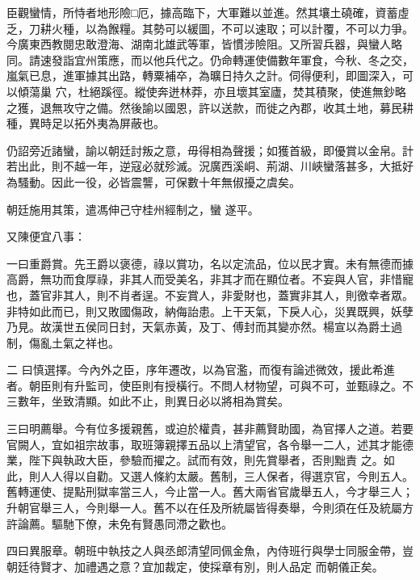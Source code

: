 \begin{pinyinscope}
 臣觀蠻情，所恃者地形險□厄，據高臨下，大軍難以並進。然其壤土磽確，資蓄虛乏，刀耕火種，以為餱糧。其勢可以緩圖，不可以速取；可以計覆，不可以力爭。今廣東西教閱忠敢澄海、湖南北雄武等軍，皆慣涉險阻。又所習兵器，與蠻人略同。請速發詣宜州策應，而以他兵代之。仍命轉運使備數年軍食，今秋、冬之交，嵐氣已息，進軍據其出路，轉粟補卒，為曠日持久之計。伺得便利，即圖深入，可以傾蕩巢
 穴，杜絕蹊徑。縱使奔迸林莽，亦且壞其室廬，焚其積聚，使進無鈔略之獲，退無攻守之備。然後諭以國恩，許以送款，而徙之內郡，收其土地，募民耕種，異時足以拓外夷為屏蔽也。



 仍詔旁近諸蠻，諭以朝廷討叛之意，毋得相為聲援；如獲首級，即優賞以金帛。計若出此，則不越一年，逆寇必就殄滅。況廣西溪峒、荊湖、川峽蠻落甚多，大抵好為騷動。因此一役，必皆震讋，可保數十年無俶擾之虞矣。



 朝廷施用其策，遣馮伸己守桂州經制之，蠻
 遂平。



 又陳便宜八事：



 一曰重爵賞。先王爵以褒德，祿以賞功，名以定流品，位以民才實。未有無德而據高爵，無功而食厚祿，非其人而受美名，非其才而在顯位者。不妄與人官，非惜寵也，蓋官非其人，則不肖者逞。不妄賞人，非愛財也，蓋實非其人，則徼幸者眾。非特如此而已，則又敗國傷政，納侮詒患。上干天氣，下戾人心，災異既興，妖孽乃見。故漢世五侯同日封，天氣赤黃，及丁、傅封而其變亦然。楊宣以為爵土過制，傷亂土氣之祥也。



 二
 曰慎選擇。今內外之臣，序年遷改，以為官濫，而復有論述微效，援此希進者。朝臣則有升監司，使臣則有授橫行。不問人材物望，可與不可，並甄祿之。不三數年，坐致清顯。如此不止，則異日必以將相為賞矣。



 三曰明薦舉。今有位多援親舊，或迫於權貴，甚非薦賢助國，為官擇人之道。若要官闕人，宜如祖宗故事，取班簿親擇五品以上清望官，各令舉一二人，述其才能德業，陛下與執政大臣，參驗而擢之。試而有效，則先賞舉者，否則黜責
 之。如此，則人人得以自勸。又選人條約太嚴。舊制，三人保者，得選京官，今則五人。舊轉運使、提點刑獄率當三人，今止當一人。舊大兩省官歲舉五人，今才舉三人；升朝官舉三人，今則舉一人。舊不以在任及所統屬皆得奏舉，今則須在任及統屬方許論薦。驅馳下僚，未免有賢愚同滯之歡也。



 四曰異服章。朝班中執技之人與丞郎清望同佩金魚，內侍班行與學士同服金帶，豈朝廷待賢才、加禮遇之意？宜加裁定，使採章有別，則人品定
 而朝儀正矣。




\end{pinyinscope}
